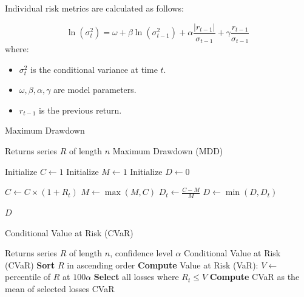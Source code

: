 \documentclass[3p,times,procedia]{elsarticle}
\begin{document}
Individual risk metrics are calculated as follows:

\begin{equation}
\ln(\sigma_t^2) = \omega + \beta \ln(\sigma_{t-1}^2) + \alpha \frac{|r_{t-1}|}{\sigma_{t-1}} + \gamma \frac{r_{t-1}}{\sigma_{t-1}}
\end{equation}
\vspace{-0.1cm}
where:
\begin{itemize}
    \item $\sigma_t^2$ is the conditional variance at time $t$.
    \item $\omega, \beta, \alpha, \gamma$ are model parameters.
    \item $r_{t-1}$ is the previous return.
\end{itemize}


\begin{algorithm}
\caption{Maximum Drawdown}
\label{alg:max_drawdown}
\begin{algorithmic}[1]
    \Require Returns series \( R \) of length \( n \)
    \Ensure Maximum Drawdown (MDD)
    
    \State Initialize \( C \gets 1 \) 
    \State Initialize \( M \gets 1 \) 
    \State Initialize \( D \gets 0 \) 

        \State \( C \gets C \times (1 + R_t) \) 
        \State \( M \gets \max(M, C) \) 
        \State \( D_t \gets \frac{C - M}{M} \) 
        \State \( D \gets \min(D, D_t) \) 
    \EndFor

    \State \Return \( D \)
\end{algorithmic}
\end{algorithm}

\vspace{1cm}

\begin{algorithm}
\caption{Conditional Value at Risk (CVaR)}
\label{alg:cvar}
\begin{algorithmic}[1]
    \Require Returns series $R$ of length $n$, confidence level $\alpha$
    \Ensure Conditional Value at Risk (CVaR)
    \State \textbf{Sort} $R$ in ascending order 
    \State \textbf{Compute} Value at Risk (VaR): $V \gets$ percentile of $R$ at $100\alpha$
    \State \textbf{Select} all losses where $R_t \leq V$
    \State \textbf{Compute} CVaR as the mean of selected losses
    \State \Return CVaR
\end{algorithmic}
\end{algorithm}
\end{document}
